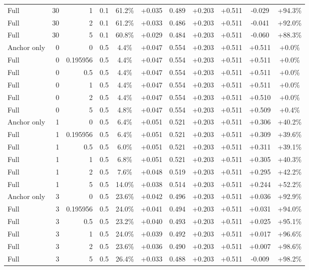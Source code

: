 \begin{table}[htbp]
\begin{tabular}{lrrrccccccc}
Full & 30 & 1 & 0.1 & 61.2\% & +0.035 & 0.489 & +0.203 & +0.511 & -0.029 & +94.3\% \\
Full & 30 & 2 & 0.1 & 61.2\% & +0.033 & 0.486 & +0.203 & +0.511 & -0.041 & +92.0\% \\
Full & 30 & 5 & 0.1 & 60.8\% & +0.029 & 0.484 & +0.203 & +0.511 & -0.060 & +88.3\% \\
Anchor only & 0 & 0 & 0.5 & 4.4\% & +0.047 & 0.554 & +0.203 & +0.511 & +0.511 & +0.0\% \\
Full & 0 & 0.195956 & 0.5 & 4.4\% & +0.047 & 0.554 & +0.203 & +0.511 & +0.511 & +0.0\% \\
Full & 0 & 0.5 & 0.5 & 4.4\% & +0.047 & 0.554 & +0.203 & +0.511 & +0.511 & +0.0\% \\
Full & 0 & 1 & 0.5 & 4.4\% & +0.047 & 0.554 & +0.203 & +0.511 & +0.511 & +0.0\% \\
Full & 0 & 2 & 0.5 & 4.4\% & +0.047 & 0.554 & +0.203 & +0.511 & +0.510 & +0.0\% \\
Full & 0 & 5 & 0.5 & 4.8\% & +0.047 & 0.554 & +0.203 & +0.511 & +0.509 & +0.4\% \\
Anchor only & 1 & 0 & 0.5 & 6.4\% & +0.051 & 0.521 & +0.203 & +0.511 & +0.306 & +40.2\% \\
Full & 1 & 0.195956 & 0.5 & 6.4\% & +0.051 & 0.521 & +0.203 & +0.511 & +0.309 & +39.6\% \\
Full & 1 & 0.5 & 0.5 & 6.0\% & +0.051 & 0.521 & +0.203 & +0.511 & +0.311 & +39.1\% \\
Full & 1 & 1 & 0.5 & 6.8\% & +0.051 & 0.521 & +0.203 & +0.511 & +0.305 & +40.3\% \\
Full & 1 & 2 & 0.5 & 7.6\% & +0.048 & 0.519 & +0.203 & +0.511 & +0.295 & +42.2\% \\
Full & 1 & 5 & 0.5 & 14.0\% & +0.038 & 0.514 & +0.203 & +0.511 & +0.244 & +52.2\% \\
Anchor only & 3 & 0 & 0.5 & 23.6\% & +0.042 & 0.496 & +0.203 & +0.511 & +0.036 & +92.9\% \\
Full & 3 & 0.195956 & 0.5 & 24.0\% & +0.041 & 0.494 & +0.203 & +0.511 & +0.031 & +94.0\% \\
Full & 3 & 0.5 & 0.5 & 23.2\% & +0.040 & 0.493 & +0.203 & +0.511 & +0.025 & +95.1\% \\
Full & 3 & 1 & 0.5 & 24.0\% & +0.039 & 0.492 & +0.203 & +0.511 & +0.017 & +96.6\% \\
Full & 3 & 2 & 0.5 & 23.6\% & +0.036 & 0.490 & +0.203 & +0.511 & +0.007 & +98.6\% \\
Full & 3 & 5 & 0.5 & 26.4\% & +0.033 & 0.488 & +0.203 & +0.511 & -0.009 & +98.2\% \\

\end{tabular}
\end{table}
